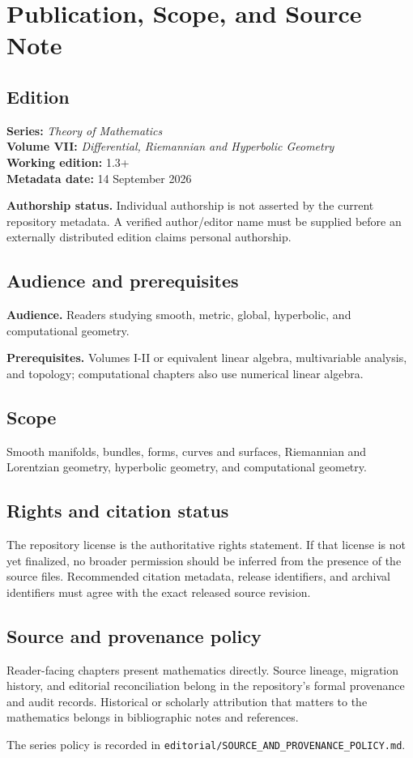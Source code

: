 \chapter*{Publication, Scope, and Source Note}
{}

\section*{Edition}
\textbf{Series:} \emph{Theory of Mathematics}\\
\textbf{Volume VII:} \emph{Differential, Riemannian and Hyperbolic Geometry}\\
\textbf{Working edition:} 1.3+\\
\textbf{Metadata date:} 14 September 2026

\textbf{Authorship status.} Individual authorship is not asserted by the current repository metadata. A verified author/editor name must be supplied before an externally distributed edition claims personal authorship.

\section*{Audience and prerequisites}
\textbf{Audience.} Readers studying smooth, metric, global, hyperbolic, and computational geometry.

\textbf{Prerequisites.} Volumes I-II or equivalent linear algebra, multivariable analysis, and topology; computational chapters also use numerical linear algebra.

\section*{Scope}
Smooth manifolds, bundles, forms, curves and surfaces, Riemannian and Lorentzian geometry, hyperbolic geometry, and computational geometry.

\section*{Rights and citation status}
The repository license is the authoritative rights statement. If that license is
not yet finalized, no broader permission should be inferred from the presence of
the source files. Recommended citation metadata, release identifiers, and
archival identifiers must agree with the exact released source revision.

\section*{Source and provenance policy}
Reader-facing chapters present mathematics directly. Source lineage, migration
history, and editorial reconciliation belong in the repository's formal
provenance and audit records. Historical or scholarly attribution that matters
to the mathematics belongs in bibliographic notes and references.

The series policy is recorded in
\texttt{editorial/SOURCE\_AND\_PROVENANCE\_POLICY.md}.
